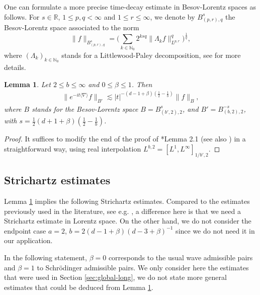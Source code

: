\documentclass[12pt]{article}
\theoremstyle{plain}
\newtheorem{lemma}[theo]{Lemma}
\begin{document}
One can formulate a more precise time-decay estimate in Besov-Lorentz spaces as follows. For $s\in\mathbb{R}$, $1\le p,q<\infty$ and $1\le r\le\infty$, we denote by $B^s_{(p,r),q}$ the Besov-Lorentz space associated to the norm
\begin{equation*}
    \|f\|_{B^s_{(p,r),q}}=\Big(\sum_{k\in\mathbb{N}_0}2^{ksq}\|\Lambda_kf\|^q_{L^{p,r}}\Big)^{\frac1q},
\end{equation*}
where $(\Lambda_k)_{k\in\mathbb{N}_0}$ stands for a Littlewood-Paley decomposition, see \cite{SeegerTrebels} for more details.

\begin{lemma}\label{lem:decay_Besov}
Let $2\le b\le\infty$ and $0\le\beta\le1$. Then
\begin{align*}
\|e^{-it\langle\nabla\rangle}f\|_{B'}\lesssim |t|^{-(d-1+\beta)(\frac12-\frac1b)}\|f\|_B,
\end{align*}
where $B$ stands for the Besov-Lorentz space $B=B_{(b',2),2}^s$, and $B'=B_{(b,2),2}^{-s}$, with $s=\frac12(d+1+\beta)(\frac12-\frac1b)$.
\end{lemma}

\begin{proof}
   It suffices to modify the end of the proof of \cite{GinibreVelo_Timedecay}*{Lemma 2.1} (see also \cite{Brenner})  in a straightforward way, using real interpolation $L^{b,2}=[L^1,L^\infty]_{1/b',2}$.
\end{proof}




\subsection{Strichartz estimates}\label{subsec:Strichartz}


Lemma \ref{lem:decay_Besov} implies the following Strichartz estimates. Compared to the estimates previously used in the literature, see e.g. \cites{Machihara_et_al,dancona_fan08}, a difference here is that we need a Strichartz estimate in Lorentz space. On the other hand, we do not consider the endpoint case $a=2$, $b=2(d-1+\beta)(d-3+\beta)^{-1}$ since we do not need it in our application.

In the following statement, $\beta=0$ corresponds to the usual wave admissible pairs and $\beta=1$ to Schrödinger admissible pairs. We only consider here the estimates that were used in Section \ref{sec:global-long}, we do not state more general estimates that could be deduced from Lemma \ref{lem:decay_Besov}.
\end{document}
